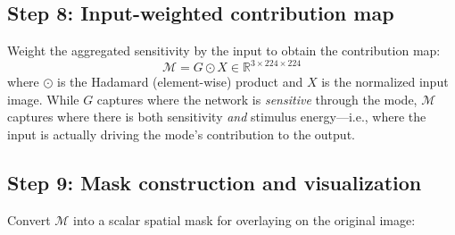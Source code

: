 \documentclass[11pt]{article}
\begin{document}
\subsection{Step 8: Input-weighted contribution map}

Weight the aggregated sensitivity by the input to obtain the contribution map:
\begin{equation}
    \mathcal{M} = G \odot X \in \mathbb{R}^{3 \times 224 \times 224}
    \label{eq:contrib_map}
\end{equation}
where $\odot$ is the Hadamard (element-wise) product and $X$ is the normalized input image.
While $G$ captures where the network is \emph{sensitive} through the mode, $\mathcal{M}$ captures where there is both sensitivity \emph{and} stimulus energy---i.e., where the input is actually driving the mode's contribution to the output.

\subsection{Step 9: Mask construction and visualization}

Convert $\mathcal{M}$ into a scalar spatial mask for overlaying on the original image:
\end{document}
